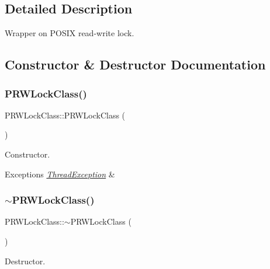 \subsection{Detailed Description}
Wrapper on P\+O\+S\+IX read-\/write lock. 

\subsection{Constructor \& Destructor Documentation}
\mbox{\label{classPRWLockClass_ac59b2064213975c386238642138d1b6b}} 
\subsubsection{\texorpdfstring{P\+R\+W\+Lock\+Class()}{PRWLockClass()}}
{\footnotesize\ttfamily P\+R\+W\+Lock\+Class\+::\+P\+R\+W\+Lock\+Class (\begin{DoxyParamCaption}{ }\end{DoxyParamCaption})\hspace{0.3cm}{\ttfamily [noexcept]}}

Constructor. 
\begin{DoxyExceptions}{Exceptions}
{\em \hyperlink{classThreadException}{Thread\+Exception}} & \\
\hline
\end{DoxyExceptions}
\mbox{\label{classPRWLockClass_a88c4b20ab74e7169502b150c21ddcb7b}} 
\subsubsection{\texorpdfstring{$\sim$\+P\+R\+W\+Lock\+Class()}{~PRWLockClass()}}
{\footnotesize\ttfamily P\+R\+W\+Lock\+Class\+::$\sim$\+P\+R\+W\+Lock\+Class (\begin{DoxyParamCaption}{ }\end{DoxyParamCaption})\hspace{0.3cm}{\ttfamily [virtual]}}



Destructor. 




